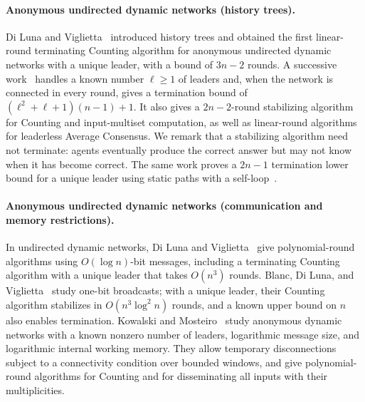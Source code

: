 \documentclass[11pt]{article}
\begin{document}
\paragraph{Anonymous undirected dynamic networks (history trees).}
Di Luna and Viglietta~\cite{DV22} introduced history trees and obtained
the first linear-round terminating Counting algorithm for anonymous
undirected dynamic networks with a unique leader, with a bound of
\(3n-2\) rounds. A successive work~\cite{DLV26} handles a known
number \(\ell\geq1\) of leaders and, when the network is connected in
every round, gives a termination bound of
\((\ell^2+\ell+1)(n-1)+1\). It also gives a \(2n-2\)-round stabilizing
algorithm for Counting and input-multiset computation, as well as
linear-round algorithms for leaderless Average Consensus. We remark that a stabilizing algorithm need not terminate: agents eventually produce the
correct answer but may not know when it has become correct. 
The same work proves a \(2n-1\) termination lower bound for a unique
leader using static paths with a self-loop~\cite{DLV26}.

\paragraph{Anonymous undirected dynamic networks (communication and memory restrictions).}
In undirected dynamic networks, Di Luna and
Viglietta~\cite{DV25} give polynomial-round algorithms
using \(O(\log n)\)-bit messages, including a
terminating Counting algorithm with a unique leader that takes
\(O(n^3)\) rounds.
Blanc, Di Luna, and Viglietta~\cite{BDV26} study one-bit broadcasts;
with a unique leader, their Counting algorithm stabilizes in
\(O(n^3\log^2 n)\) rounds, and a known upper bound on \(n\) also enables
termination.
Kowalski and Mosteiro~\cite{KM26} study anonymous dynamic networks
with a known nonzero number of leaders, logarithmic message size, and
logarithmic internal working memory. They allow temporary disconnections subject
to a connectivity condition over bounded windows, and give
polynomial-round algorithms for Counting and for
disseminating all inputs with their multiplicities. 
\end{document}
